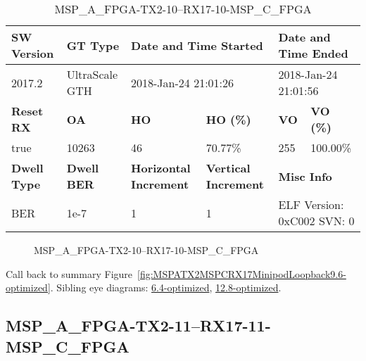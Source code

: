 \begin{table}[h]
\centering
\caption{MSP\_A\_FPGA-TX2-10--RX17-10-MSP\_C\_FPGA}
\label{tab:MSPAFPGATX210RX1710MSPCFPGA9.6-optimized}
\begin{tabular}{@{}|l|l|l|l|l|l|@{}}
\toprule
\textbf{SW Version}                & \textbf{GT Type}   & \multicolumn{2}{l|}{\textbf{Date and Time Started}}            & \multicolumn{2}{l|}{\textbf{Date and Time Ended}}        \\ \midrule
2017.2                       & UltraScale GTH          & \multicolumn{2}{l|}{2018-Jan-24 21:01:26}                   & \multicolumn{2}{l|}{2018-Jan-24 21:01:56}               \\ \midrule
\textbf{Reset RX}                  & \textbf{OA} & \textbf{HO}   & \textbf{HO (\%)} & \textbf{VO} & \textbf{VO (\%)} \\ \midrule
true & 10263        & 46          & 70.77\%        & 255        & 100.00\%       \\ \midrule
\textbf{Dwell Type}                & \textbf{Dwell BER} & \textbf{Horizontal Increment} & \textbf{Vertical Increment}    & \multicolumn{2}{l|}{\textbf{Misc Info}}                  \\ \midrule
BER                            & 1e-7        & 1        & 1           & \multicolumn{2}{l|}{ELF Version: 0xC002 SVN: 0}                         \\ \bottomrule
\end{tabular}
\end{table}

\begin{figure}[h]
\caption{MSP\_A\_FPGA-TX2-10--RX17-10-MSP\_C\_FPGA} \label{fig:MSPAFPGATX210RX1710MSPCFPGA9.6-optimized}
\end{figure}

Call back to summary Figure~\ref{fig:MSPATX2MSPCRX17MinipodLoopback9.6-optimized}.
Sibling eye diagrams: \hyperref[sec:MSPAFPGATX210RX1710MSPCFPGA6.4-optimized]{6.4-optimized}, \hyperref[sec:MSPAFPGATX210RX1710MSPCFPGA12.8-optimized]{12.8-optimized}.

\clearpage
\newpage


\subsection{MSP\_A\_FPGA-TX2-11--RX17-11-MSP\_C\_FPGA}\label{sec:MSPAFPGATX211RX1711MSPCFPGA9.6-optimized}

